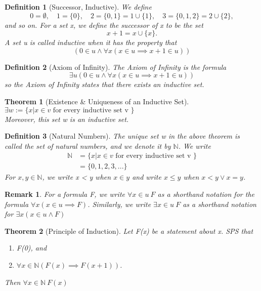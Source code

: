 \documentclass[11pt, oneside]{book}
\theoremstyle{break}
\newtheorem{thm}{Theorem}[section]
\newtheorem*{remark}{Remark}
\newtheorem{defn}{Definition}[section]
\newcommand{\bb}[1]{\mathbb{#1}}			%
\begin{document}
\begin{defn}[Successor, Inductive]
	We define
	\[
		0 = \emptyset, \quad	1 = \{0\}, \quad	2 = \{0, 1\} = 1 \cup \{1\}, \quad	3 = \{0, 1, 2\} = 2 \cup \{2\},
	\] and so on. For a set x, we define the successor of x to be the set
	\[
		x + 1 = x \cup \{x\}.
	\] A set u is called inductive when it has the property that
	\[
		(0 \in u \land \forall x (x \in u \implies x + 1 \in u))
	\]
\end{defn}

\begin{defn}[Axiom of Infinity]
	The Axiom of Infinity is the formula
	\[
		\exists u (0 \in u \land \forall x (x \in u \implies x + 1 \in u))
	\] so the Axiom of Infinity states that there exists an inductive set.
\end{defn}

\begin{thm}[Existence \& Uniqueness of an Inductive Set]
	$\exists w := \{x | x \in v \text{ for every inductive set v }\}$ \\
	Moreover, this set w is an inductive set.
\end{thm}

\begin{defn}[Natural Numbers]
	The unique set w in the above theorem is called the set of natural numbers, and we denote it by $\bb{N}$. We write
	\begin{align*}
		\bb{N} &= \{x | x \in v \text{ for every inductive set v }\} \\
			   &= \{0, 1, 2, 3, ...\}
	\end{align*}
	For $x, y \in \bb{N}$, we write x < y when $x \in y$ and write $x \leq y$ when $x < y \lor x = y$.
\end{defn}

\begin{remark}
	For a formula F, we write $\forall x \in u \> F$ as a shorthand notation for the formula $\forall x (x \in u \implies F)$. Similarly, we write $\exists x \in u \> F$ as a shorthand notation for $\exists x (x \in u \land F)$
\end{remark}

\begin{thm}[Principle of Induction]
	Let F(x) be a statement about x. SPS that
	\begin{enumerate}
		\item F(0), and
		\item $\forall x \in \bb{N} (F(x) \implies F(x+1))$.
	\end{enumerate}
	Then $\forall x \in \bb{N} \> F(x)$
\end{thm}
\end{document}
